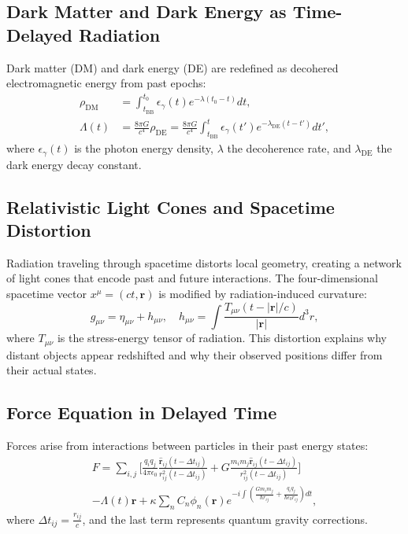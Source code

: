 \documentclass[12pt, a4paper]{article}
\begin{document}
\subsection{Dark Matter and Dark Energy as Time-Delayed Radiation}
Dark matter (DM) and dark energy (DE) are redefined as decohered electromagnetic energy from past epochs:
\begin{align}
\rho_{\text{DM}} &= \int_{t_{\text{BB}}}^{t_0} \epsilon_{\gamma}(t) e^{-\lambda (t_0 - t)} dt, \label{eq:dm} \\
\Lambda(t) &= \frac{8\pi G}{c^4} \rho_{\text{DE}} = \frac{8\pi G}{c^4} \int_{t_{\text{BB}}}^{t} \epsilon_{\gamma}(t') e^{-\lambda_{\text{DE}} (t - t')} dt', \label{eq:de}
\end{align}
where \( \epsilon_{\gamma}(t) \) is the photon energy density, \( \lambda \) the decoherence rate, and \( \lambda_{\text{DE}} \) the dark energy decay constant.

\subsection{Relativistic Light Cones and Spacetime Distortion}
Radiation traveling through spacetime distorts local geometry, creating a network of light cones that encode past and future interactions. The four-dimensional spacetime vector \( x^\mu = (ct, \bm{r}) \) is modified by radiation-induced curvature:
\begin{equation}
g_{\mu\nu} = \eta_{\mu\nu} + h_{\mu\nu}, \quad h_{\mu\nu} = \int \frac{T_{\mu\nu}(t - |\bm{r}|/c)}{|\bm{r}|} d^3r, \label{eq:metric_pert}
\end{equation}
where \( T_{\mu\nu} \) is the stress-energy tensor of radiation. This distortion explains why distant objects appear redshifted and why their observed positions differ from their actual states.

\subsection{Force Equation in Delayed Time}
Forces arise from interactions between particles in their past energy states:
\begin{multline}
F = \sum_{i,j} \Bigg[ \frac{q_i q_j}{4\pi \epsilon_0} \frac{\hat{\bm{r}}_{ij}(t - \Delta t_{ij})}{r_{ij}^2(t - \Delta t_{ij})} + G \frac{m_i m_j \hat{\bm{r}}_{ij}(t - \Delta t_{ij})}{r_{ij}^2(t - \Delta t_{ij})} \Bigg] \\
- \Lambda(t) \bm{r} + \kappa \sum_{n} C_n \phi_n(\bm{r}) e^{-i \int \left( \frac{G m_i m_j}{\hbar r_{ij}} + \frac{q_i q_j}{\hbar \epsilon_0 r_{ij}} \right) dt}, \label{eq:force}
\end{multline}
where \( \Delta t_{ij} = \frac{r_{ij}}{c} \), and the last term represents quantum gravity corrections.
\end{document}
